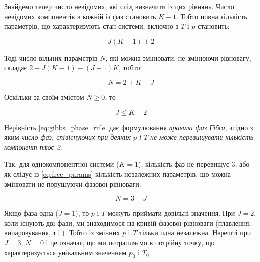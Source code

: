 Знайдемо тепер число невідомих, які слід визначити із цих рівнянь. Число невідомих компонентів в
кожній із фаз становить $K-1$. Тобто повна кількість параметрів, що характеризують стан системи,
включно з $T$ і $p$ становить:

\begin{equation}\label{eq:total_params}
J(K - 1) + 2
\end{equation}

Тоді число вільних параметрів $N$, які можна змінювати, не змінюючи рівновагу, складає $2 + J(K - 1) -
(J - 1)K$, тобто:

\begin{equation}\label{eq:free_params}
N = 2 + K - J
\end{equation}

Оскільки за своїм змістом $N \geq 0$, то

\begin{equation}\label{eq:gibbs_phase_rule}
J \leq K + 2
\end{equation}

Нерівність \eqref{eq:gibbs_phase_rule} дає формулювання \emph{правила фаз Гібса}, згідно з яким
\emph{число фаз, співіснуючих при деяких $p$ і $T$ не може перевищувати кількість компонент плюс 2}.

Так, для однокомпонентної системи ($K=1$), кількість фаз не перевищує 3, або як слідує із
\eqref{eq:free_params} кількість незалежних параметрів, що можна змінювати не порушуючи фазової
рівноваги:

\begin{equation}\label{eq:one_component}
N = 3 - J
\end{equation}

Якщо фаза одна ($J=1$), то $p$ і $T$ можуть приймати довільні значення. При $J=2$, коли існують дві
фази, ми знаходимося на кривій фазової рівноваги (плавлення, випаровування, т.і.). Тобто із змінних
$p$ і $T$ тільки одна незалежна. Нарешті при $J=3$, $N=0$ і це означає, що ми потрапляємо в потрійну
точку, що характеризується унікальним значенням $p_0$ і $T_0$.

